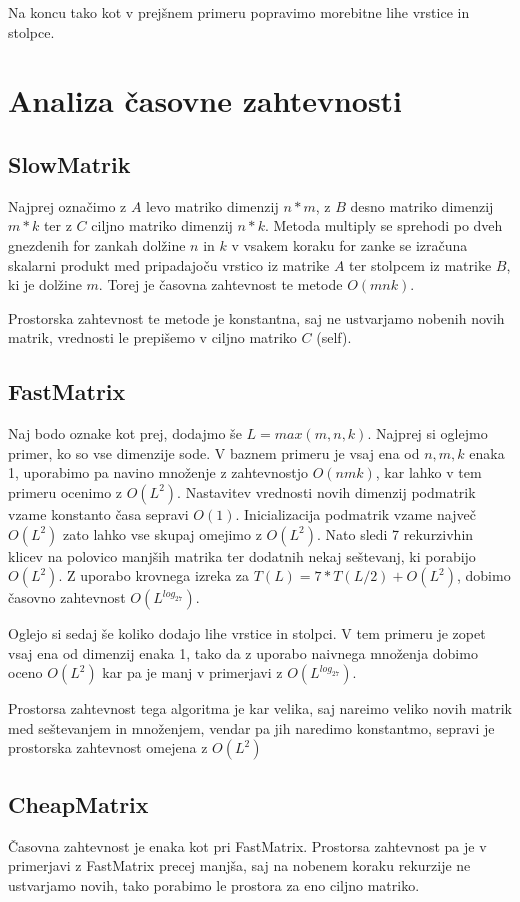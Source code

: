 \documentclass[a4paper]{article}
\begin{document}
Na koncu tako kot v prejšnem primeru popravimo morebitne lihe vrstice in stolpce.

\section{Analiza časovne zahtevnosti}
\subsection{SlowMatrik}
Najprej označimo z $A$ levo matriko dimenzij $n * m$, z $B$ desno matriko dimenzij $m*k$ ter z $C$ ciljno matriko dimenzij $n*k$. Metoda multiply se sprehodi po dveh gnezdenih for zankah dolžine $n$ in $k$ v vsakem koraku for zanke se izračuna skalarni produkt med pripadajoču vrstico iz matrike $A$ ter stolpcem iz matrike $B$, ki je dolžine $m$. Torej je časovna zahtevnost te metode $O(mnk)$. 

Prostorska zahtevnost te metode je konstantna, saj ne ustvarjamo nobenih novih matrik, vrednosti le prepišemo v ciljno matriko $C$ (self).

\subsection{FastMatrix}
Naj bodo oznake kot prej, dodajmo še $L = max(m,n,k)$. Najprej si oglejmo primer, ko so vse dimenzije sode. V baznem primeru je vsaj ena od $n,m,k$ enaka 1, uporabimo pa navino množenje z zahtevnostjo $O(nmk)$, kar lahko v tem primeru ocenimo z $O(L^2)$. Nastavitev vrednosti novih dimenzij podmatrik vzame konstanto časa sepravi $O(1)$. Inicializacija podmatrik vzame največ $O(L^2)$ zato lahko vse skupaj omejimo z $O(L^2)$. Nato sledi 7 rekurzivhin klicev na polovico manjših matrika ter dodatnih nekaj seštevanj, ki porabijo $O(L^2)$. Z uporabo krovnega izreka za $T(L) = 7*T(L/2) + O(L^2)$, dobimo časovno zahtevnost $O(L^{log_27})$.

Oglejo si sedaj še koliko dodajo lihe vrstice in stolpci. V tem primeru je zopet vsaj ena od dimenzij enaka 1, tako da z uporabo naivnega množenja dobimo oceno $O(L^2)$ kar pa je manj v primerjavi z $O(L^{log_27})$.

Prostorsa zahtevnost tega algoritma je kar velika, saj nareimo veliko novih matrik med seštevanjem in množenjem, vendar pa jih naredimo konstantmo, sepravi je prostorska zahtevnost omejena z $O(L^2)$

\subsection{CheapMatrix}
Časovna zahtevnost je enaka kot pri FastMatrix. Prostorsa zahtevnost pa je v primerjavi z FastMatrix precej manjša, saj na nobenem koraku rekurzije ne ustvarjamo novih, tako porabimo le prostora za eno ciljno matriko.
\end{document}
